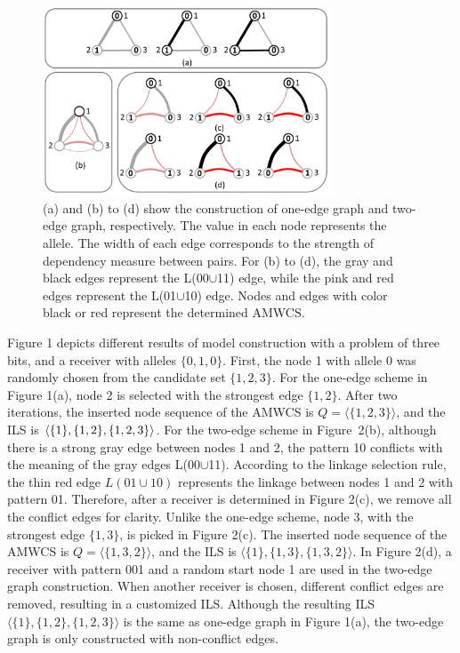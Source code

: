 \documentclass{sig-alternate-05-2015}
\begin{document}
\begin{figure}
\centering
\includegraphics[width=3.4in]{AMWCS}
\caption{(a)  and (b) to (d) show the construction of  one-edge graph and two-edge graph, respectively. The value in each node represents the allele. The width of each edge corresponds to the strength of dependency measure between pairs. For (b) to (d), the gray and black edges represent the L(00$\cup$11) edge, while the pink and red edges represent the L(01$\cup$10) edge. Nodes and edges with color black or red represent the determined AMWCS.}
\end{figure}


Figure 1 depicts different results of model construction with  a problem of three bits, and a receiver with alleles $\{0, 1, 0\}$. First, the node 1 with allele 0 was randomly chosen from the candidate set $\{1, 2, 3\}$. For the one-edge scheme in Figure 1(a), node 2 is selected with the strongest edge $\{1, 2\}$. After two iterations, the inserted node sequence of the AMWCS  is $Q = \langle\{1, 2, 3\}\rangle$, and the ILS is  $\langle\{1\}, \{1, 2\}, \\ \{1, 2, 3\}\rangle$. For the two-edge scheme in Figure~2(b), although there is a strong gray edge between nodes 1 and 2,  the pattern 10 conflicts with the meaning of the gray edges L(00$\cup$11). According to the linkage selection rule, the thin red edge $L(01\cup10)$ represents the linkage between nodes 1 and 2 with pattern 01. Therefore, after a receiver is determined in Figure 2(c), we remove all the conflict edges for clarity. Unlike the one-edge scheme, node 3, with the strongest edge $\{1, 3\}$, is picked in Figure 2(c). The inserted node sequence of the AMWCS is $Q = \langle\{1, 3, 2\}\rangle$,  and the ILS is $\langle\{1\}, \{1, 3\}, \{1, 3, 2\}\rangle$. In Figure 2(d), a receiver with pattern 001 and a random start node 1 are used in the two-edge graph construction. When another receiver is chosen, different conflict edges are removed, resulting in a customized ILS. Although the resulting ILS  $\langle\{1\}, \{1, 2\}, \{1, 2, 3\}\rangle$ is the same as one-edge graph in Figure 1(a), the two-edge graph is only constructed with non-conflict edges. 
\end{document}
